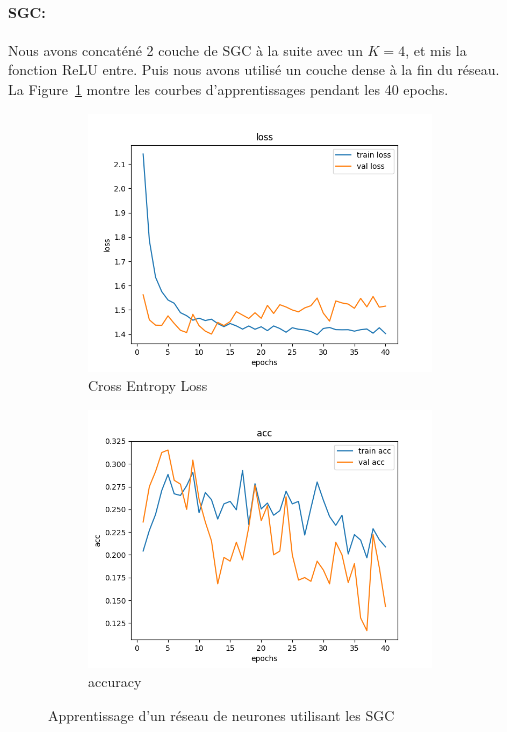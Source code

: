 \documentclass[a4paper]{article}
\begin{document}
\paragraph{SGC:}
Nous avons concaténé 2 couche de SGC à la suite avec un $K=4$, et mis la fonction ReLU entre. Puis nous avons utilisé un couche dense à la fin du réseau. La Figure~\ref{fig: SGC} montre les courbes d'apprentissages pendant les 40 epochs.

\begin{figure}[ht]
    \begin{subfigure}{0.47\textwidth}
      \includegraphics[width=\linewidth]{../results/SGC_1/loss.png}
      \caption{Cross Entropy Loss}
    \end{subfigure}
    \hfill
    \begin{subfigure}{0.47\textwidth}
      \includegraphics[width=\linewidth]{../results/SGC_1/acc.png}
      \caption{accuracy}
    \end{subfigure}
    \caption{Apprentissage d'un réseau de neurones utilisant les SGC}
    \label{fig: SGC}
\end{figure}
\end{document}
